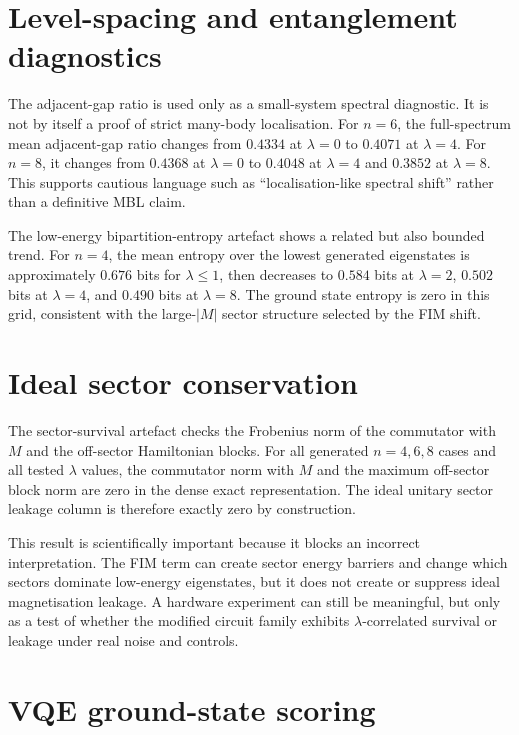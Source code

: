 \documentclass[preprint,aps,physrev,superscriptaddress,floatfix,longbibliography]{revtex4-2}
\begin{document}
\section{Level-spacing and entanglement diagnostics}

The adjacent-gap ratio is used only as a small-system spectral diagnostic. It is
not by itself a proof of strict many-body localisation. For $n=6$, the
full-spectrum mean adjacent-gap ratio changes from $0.4334$ at $\lambda=0$ to
$0.4071$ at $\lambda=4$. For $n=8$, it changes from $0.4368$ at $\lambda=0$ to
$0.4048$ at $\lambda=4$ and $0.3852$ at $\lambda=8$. This supports cautious
language such as ``localisation-like spectral shift'' rather than a definitive
MBL claim.

The low-energy bipartition-entropy artefact shows a related but also bounded
trend. For $n=4$, the mean entropy over the lowest generated eigenstates is
approximately $0.676$ bits for $\lambda\leq 1$, then decreases to
$0.584$ bits at $\lambda=2$, $0.502$ bits at $\lambda=4$, and
$0.490$ bits at $\lambda=8$. The ground state entropy is zero in this grid,
consistent with the large-$|M|$ sector structure selected by the FIM shift.

\section{Ideal sector conservation}

The sector-survival artefact checks the Frobenius norm of the commutator with
$M$ and the off-sector Hamiltonian blocks. For all generated $n=4,6,8$ cases
and all tested $\lambda$ values, the commutator norm with $M$ and the maximum
off-sector block norm are zero in the dense exact representation. The ideal
unitary sector leakage column is therefore exactly zero by construction.

This result is scientifically important because it blocks an incorrect
interpretation. The FIM term can create sector energy barriers and change which
sectors dominate low-energy eigenstates, but it does not create or suppress
ideal magnetisation leakage. A hardware experiment can still be meaningful, but
only as a test of whether the modified circuit family exhibits
$\lambda$-correlated survival or leakage under real noise and controls.

\section{VQE ground-state scoring}
\end{document}
